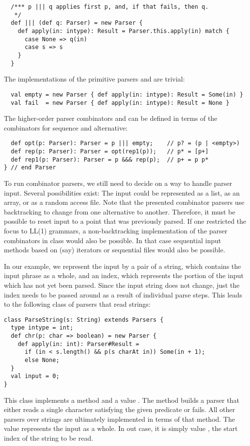 \documentclass[a4paper,12pt,twoside,titlepage]{book}
\begin{document}
{\begin{lstlisting}
  /*** p ||| q applies first p, and, if that fails, then q.
   */
  def ||| (def q: Parser) = new Parser {
    def apply(in: intype): Result = Parser.this.apply(in) match {
      case None => q(in)
      case s => s
    }
  }
\end{lstlisting}
The implementations of the primitive parsers  and 
are trivial:
\begin{lstlisting}
  val empty = new Parser { def apply(in: intype): Result = Some(in) }
  val fail  = new Parser { def apply(in: intype): Result = None }
\end{lstlisting}
The higher-order parser combinators  and  can be
defined in terms of the combinators for sequence and alternative:
\begin{lstlisting}
  def opt(p: Parser): Parser = p ||| empty;    // p? = (p | <empty>)
  def rep(p: Parser): Parser = opt(rep1(p));   // p* = [p+]
  def rep1(p: Parser): Parser = p &&& rep(p);  // p+ = p p*
} // end Parser
\end{lstlisting}
To run combinator parsers, we still need to decide on a way to handle
parser input. Several possibilities exist: The input could be
represented as a list, as an array, or as a random access file.  Note
that the presented combinator parsers use backtracking to change from
one alternative to another.  Therefore, it must be possible to reset
input to a point that was previously parsed. If one restricted the
focus to LL(1) grammars, a non-backtracking implementation of the
parser combinators in class  would also be possible. In
that case sequential input methods based on (say) iterators or
sequential files would also be possible.

In our example, we represent the input by a pair of a string, which
contains the input phrase as a whole, and an index, which represents
the portion of the input which has not yet been parsed. Since the
input string does not change, just the index needs to be passed around
as a result of individual parse steps.  This leads to the following
class of parsers that read strings:
\begin{lstlisting}
class ParseString(s: String) extends Parsers {
  type intype = int;
  def chr(p: char => boolean) = new Parser {
    def apply(in: int): Parser#Result = 
      if (in < s.length() && p(s charAt in)) Some(in + 1);
      else None;
  }
  val input = 0;
}
\end{lstlisting}
This class implements a method  and a
value . The  method builds a parser that either
reads a single character satisfying the given predicate  or
fails.  All other parsers over strings are ultimately implemented in
terms of that method. The  value represents the input as a
whole. In out case, it is simply value , the start index of
the string to be read.

}
\end{document}
